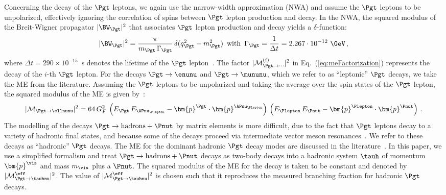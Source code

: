 Concerning the decay of the $\Pgt$ leptons,
we again use the narrow-width approximation (NWA) and assume the $\Pgt$ leptons to be unpolarized,
effectively ignoring the correlation of spins between $\Pgt$
lepton production and decay.
In the NWA, the squared modulus of the Breit-Wigner propagator $\vert
\BW_{\Pgt} \vert^{2}$ that associates $\Pgt$ lepton production and
decay yields a $\delta$-function:
\begin{equation}
\vert \BW_{\Pgt} \vert^{2} = \frac{\pi}{m_{\Pgt} \, \Gamma_{\Pgt}} \,
\delta ( q_{\Pgt}^{2} - m_{\Pgt}^{2} ) \, \mbox{ with } \, 
\Gamma_{\Pgt} = \frac{1}{\Delta t} =
 2.267 \cdot 10^{-12}\textrm{~\GeV} \, ,
\end{equation}
where $\Delta t = 290 \times 10^{-15}$~s denotes the lifetime of the
$\Pgt$ lepton~\cite{PDG}.
The factor $\vert \mathcal{M}^{(i)}_{\Pgt\to\cdots}
\vert^{2}$ in Eq.~(\ref{eq:meFactorization}) represents the decay of the $i$-th $\Pgt$ lepton.
For the decays $\Pgt \to \enunu$ and $\Pgt
\to \mununu$, which we refer to as ``leptonic'' $\Pgt$ decays, we take the ME from the literature.
Assuming the $\Pgt$ leptons to be unpolarized and taking the average over the spin states of the $\Pgt$ lepton,
the squared modulus of the ME is given by~\cite{Barger:1987nn}:
\begin{equation}
\vert\mathcal{M}_{\Pgt \to \ellnunu} \vert^{2} = 64 \, G^{2}_{F} \,
\left( E_{\Pgt} \, E_{\APnu_{\Plepton}} - \bm{p}^{\Pgt} \cdot
  \bm{p}^{\APnu_{\Plepton}} \right) \, \left( E_{\Plepton} \,
  E_{\Pnut} - \bm{p}^{\Plepton} \cdot \bm{p}^{\Pnut} \right) \, .
\label{eq:leptonic_tau_decays_ME}
\end{equation}
The modelling of the decays $\Pgt \to \textrm{hadrons} + \Pnut$ 
by matrix elements is more difficult, 
due to the fact that $\Pgt$ leptons decay to a variety of hadronic
final states, and because some of the decays proceed via intermediate vector
meson resonances~\cite{PDG}.
We refer to these decays as ``hadronic'' $\Pgt$ decays.
The ME for the dominant hadronic $\Pgt$ decay modes are discussed in the literature~\cite{Bullock:1992yt,Raychaudhuri:1995kv}.
In this paper, we use a simplified formalism and treat $\Pgt \to \textrm{hadrons} + \Pnut$ decays as two-body decays into a hadronic system $\tauh$ of momentum $\bm{p}^{\vis}$ and mass $m_{\vis}$ plus a $\Pnut$.
The squared modulus of the ME for the decay is taken to be constant and denoted by $\vert\mathcal{M}^{\eff}_{\Pgt \to \tauhnu}\vert^{2}$.
The value of $\vert\mathcal{M}^{\eff}_{\Pgt \to \tauhnu}\vert^{2}$ is
chosen such that it reproduces the measured branching fraction for hadronic $\Pgt$ decays.
